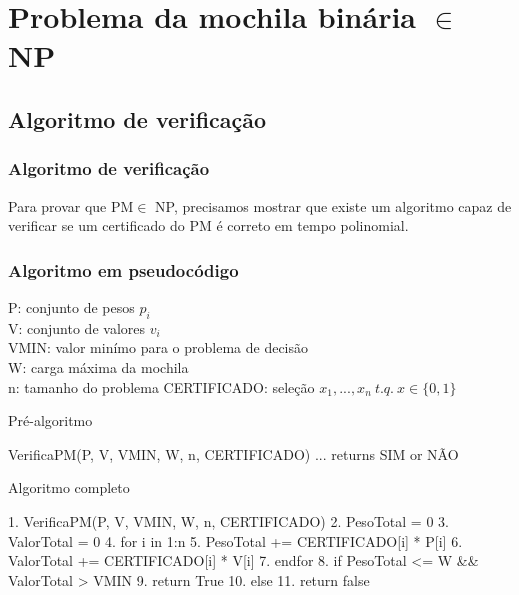\documentclass{beamer}
\begin{document}

\section{Problema da mochila binária $\in$ NP}

\subsection{Algoritmo de verificação}
\begin{frame}
    \frametitle{Algoritmo de verificação}
    Para provar que PM\footnotemark $\in$ NP, precisamos mostrar que existe um algoritmo
    capaz de verificar se um certificado do PM é correto em tempo polinomial.

\end{frame}


\begin{frame}[fragile]
    \frametitle{Algoritmo em pseudocódigo}

    P: conjunto de pesos $p_{i}$ \\
    V: conjunto de valores $v_{i}$ \\
    VMIN: valor minímo para o problema de decisão \\
    W: carga máxima da mochila \\
    n: tamanho do problema
    CERTIFICADO: seleção $x_{1},...,x_{n}\ t.q.\ x \in \{0,1\}$ \\

    \begin{block}{Pré-algoritmo}
    \begin{semiverbatim}
    VerificaPM(P, V, VMIN, W, n, CERTIFICADO)
        ...
        returns SIM or NÃO
    \end{semiverbatim}
    \end{block}

\end{frame}

\begin{frame}[fragile]
    \begin{block}{Algoritmo completo}
        \begin{semiverbatim}
        1. VerificaPM(P, V, VMIN, W, n, CERTIFICADO)
        2.    PesoTotal = 0
        3.    ValorTotal = 0
        4.    for i in 1:n
        5.        PesoTotal += CERTIFICADO[i] * P[i]
        6.        ValorTotal += CERTIFICADO[i] * V[i]
        7.    endfor
        8.    if PesoTotal <= W && ValorTotal > VMIN
        9.        return True
        10.    else
        11.       return false
        \end{semiverbatim}
    \end{block}

\end{frame}
\end{document}

